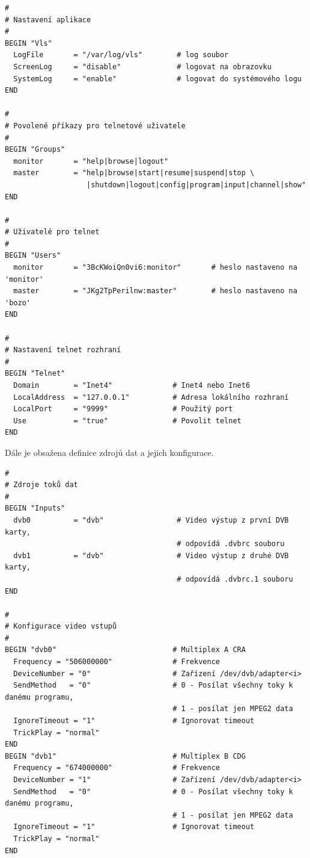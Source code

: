 \vspace{10pt}

\begin{small}
\begin{verbatim}
#
# Nastavení aplikace
#
BEGIN "Vls"
  LogFile       = "/var/log/vls"        # log soubor
  ScreenLog     = "disable"             # logovat na obrazovku
  SystemLog     = "enable"              # logovat do systémového logu
END

#
# Povolené příkazy pro telnetové uživatele
#
BEGIN "Groups"
  monitor       = "help|browse|logout"
  master        = "help|browse|start|resume|suspend|stop \
                   |shutdown|logout|config|program|input|channel|show"
END

#
# Uživatelé pro telnet
#
BEGIN "Users"
  monitor       = "3BcKWoiQn0vi6:monitor"       # heslo nastaveno na 'monitor'
  master        = "JKg2TpPerilnw:master"        # heslo nastaveno na 'bozo'
END

#
# Nastavení telnet rozhraní
#
BEGIN "Telnet"
  Domain        = "Inet4"              # Inet4 nebo Inet6
  LocalAddress  = "127.0.0.1"          # Adresa lokálního rozhraní
  LocalPort     = "9999"               # Použitý port
  Use           = "true"               # Povolit telnet
END
\end{verbatim}
\end{small}

\vspace{10pt}

Dále je obsažena definice zdrojů dat a jejich konfigurace.

\vspace{10pt}

\begin{small}
\begin{verbatim}
#
# Zdroje toků dat
#
BEGIN "Inputs"
  dvb0          = "dvb"                 # Video výstup z první DVB karty, 
                                        # odpovídá .dvbrc souboru
  dvb1          = "dvb"                 # Video výstup z druhé DVB karty, 
                                        # odpovídá .dvbrc.1 souboru
END

#
# Konfigurace video vstupů
#
BEGIN "dvb0"                           # Multiplex A CRA
  Frequency = "506000000"              # Frekvence
  DeviceNumber = "0"                   # Zařízení /dev/dvb/adapter<i>
  SendMethod   = "0"                   # 0 - Posílat všechny toky k danému programu, 
                                       # 1 - posílat jen MPEG2 data
  IgnoreTimeout = "1"                  # Ignorovat timeout
  TrickPlay = "normal"                 
END
BEGIN "dvb1"                           # Multiplex B CDG
  Frequency = "674000000"              # Frekvence
  DeviceNumber = "1"                   # Zařízení /dev/dvb/adapter<i>
  SendMethod   = "0"                   # 0 - Posílat všechny toky k danému programu, 
                                       # 1 - posílat jen MPEG2 data
  IgnoreTimeout = "1"                  # Ignorovat timeout
  TrickPlay = "normal"
END
\end{verbatim}
\end{small}


